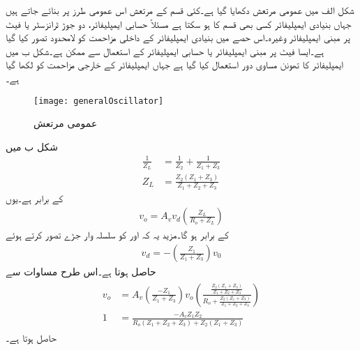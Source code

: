 شکل  الف میں عمومی مرتعش دکھایا گیا ہے۔کئی قسم کے مرتعش اس عمومی طرز پر بنائے جاتے ہیں جہاں بنیادی ایمپلیفائر کسی بھی قسم کا ہو سکتا ہے مسئلاً حسابی ایمپلیفائر، دو جوڑ ٹرانزسٹر یا فیٹ پر مبنی ایمپلیفائر وغیرہ۔اس حصے میں بنیادی ایمپلیفائر کے داخلی مزاحمت کو لامحدود تصور کیا گیا ہے۔ایسا فیٹ پر مبنی ایمپلیفائر یا حسابی ایمپلیفائر کے استعمال سے ممکن ہے۔شکل  ب میں ایمپلیفائر کا تھونن مساوی دور استعمال کیا گیا ہے جہاں ایمپلیفائر کے خارجی مزاحمت کو  لکھا گیا ہے۔ 
\begin{figure}
\centering
\texttt{[image: generalOscillator]}
\caption{عمومی مرتعش}
\label{شکل_عمومی_مرتعش}
\end{figure}
شکل  ب میں 
\begin{align*}
\frac{1}{Z_L}&=\frac{1}{Z_2}+\frac{1}{Z_1+Z_3}\\
Z_L&=\frac{Z_2 \left(Z_1+Z_3 \right)}{Z_1+Z_2+Z_3}
\end{align*}
کے برابر ہے۔یوں
\begin{align} \label{مساوات_عمومی_بار_دباو}
v_o = A_v v_d \left(\frac{Z_L}{R_o+Z_L} \right)
\end{align}
کے برابر ہو گا۔مزید یہ کہ  اور  کو سلسلہ وار جڑے تصور کرتے ہوئے
\begin{align}
v_d=-\left(\frac{Z_1}{Z_1+Z_3}\right) v_0
\end{align}
حاصل ہوتا ہے۔اس طرح مساوات  سے
\begin{gather}
\begin{aligned} \label{مساوات_عمومی_رکاوٹ_مساوات}
v_o &= A_v \left(\frac{-Z_1}{Z_1+Z_3} \right) v_o \left(\frac{\frac{Z_2 \left(Z_1+Z_3 \right)}{Z_1+Z_2+Z_3}}{R_o+\frac{Z_2 \left(Z_1+Z_3 \right)}{Z_1+Z_2+Z_3}} \right)\\
1&=\frac{-A_v Z_1 Z_2 }{R_o \left(Z_1+Z_2+Z_3 \right)+Z_2 \left(Z_1+Z_3 \right )}
\end{aligned}
\end{gather}
حاصل ہوتا ہے۔

